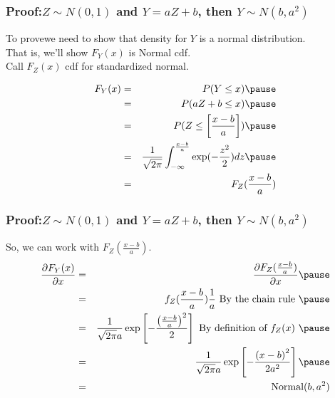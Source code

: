 \documentclass{beamer}
\numberwithin{equation}{section}
\begin{document}
\begin{frame}
\frametitle{Proof:$Z \sim N(0,1)$ and $Y = aZ + b$, then  $Y \sim N(b, a^2)$ } 
To prove\pause  we need to show that density for $Y$ is a normal distribution.  \pause  \\
That is, we'll show $F_{Y}(x)$ is Normal cdf.\pause   \\
Call $F_{Z}(x)$ cdf for standardized normal. \pause   

\begin{eqnarray}
F_{Y} (x) & = & P(Y \leq x) \nonumber  \pause  \\
& = & P(aZ + b \leq x) \nonumber  \pause  \\
& = & P(Z \leq \left[\frac{x - b}{a} \right] ) \nonumber  \pause  \\
& = & \frac{1}{\sqrt{2\pi} } \int_{-\infty}^{\frac{x-b}{a} } \exp( - \frac{z^2}{2} ) dz \nonumber \pause  \\
& = &F_{Z} (\frac{x - b}{a} )\nonumber 
 \end{eqnarray}
\end{frame}


\begin{frame}
\frametitle{Proof:$Z \sim N(0,1)$ and $Y = aZ + b$, then  $Y \sim N(b, a^2)$ } 

So, we can work with $F_{Z}(\frac{x - b}{a} )$.  \pause 
\begin{eqnarray}
\frac{\partial F_{Y}(x) }{\partial x} & =& \frac{\partial F_{Z} (\frac{x - b}{a} ) }{\partial x} \nonumber \pause \\
& = & f_{Z} (\frac{x - b}{a} ) \frac{1}{a}  \text{ By the chain rule } \pause \nonumber \\
& = & \frac{1}{\sqrt{2 \pi } a } \exp\left[-\frac{\left(\frac{x-b}{a} \right)^2}{2 }\right] \nonumber \text{ By definition of $f_{Z}(x)$ } \pause \\
& = & \frac{1}{\sqrt{2 \pi } a } \exp\left[-\frac{\left(x-b\right)^2}{2a^2 }\right] \nonumber  \pause \\
& = & \text{Normal} (b, a^2) \nonumber 
\end{eqnarray}

\end{frame}
\end{document}
